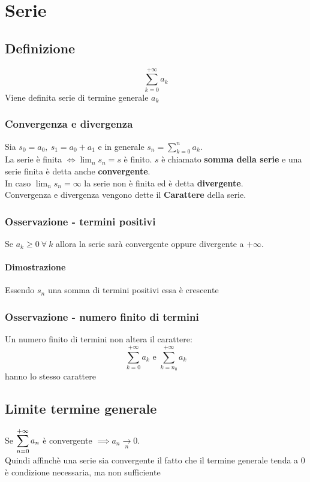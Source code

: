\chapter{Serie}
\section{Definizione}
$$\sum_{k = 0}^{+\infty}a_k$$
Viene definita serie di termine generale $a_k$
\subsection{Convergenza e divergenza}
Sia $s_0 = a_0,\ s_1 = a_0 + a_1$ e in generale $\displaystyle s_n = \sum_{k = 0}^n a_k$.\\
La serie  è finita $\iff \displaystyle \lim_n s_n = s$ è finito.
$s$ è chiamato \textbf{somma della serie} e una serie finita è detta anche \textbf{convergente}.\\
In caso $\displaystyle \lim_n s_n = \infty$ la serie non è finita ed è detta \textbf{divergente}.\\
Convergenza e divergenza vengono dette il \textbf{Carattere} della serie.
\subsection{Osservazione - termini positivi}
Se $a_k \geq 0\ \forall\ k$ allora la serie sarà convergente oppure divergente a $+\infty$.
\subsubsection{Dimostrazione}
Essendo $s_n$ una somma di termini positivi essa è crescente
\subsection{Osservazione - numero finito di termini}
Un numero finito di termini non altera il carattere:\\
$$\sum_{k = 0}^{+\infty}a_k \text{ e } \sum_{k = n_0}^{+\infty}a_k$$ hanno lo stesso carattere

\section{Limite termine generale}
Se $\displaystyle \sum_{n = 0}^{+\infty} a_n$ è convergente $\implies a_n \xrightarrow[n]{}0$.\\
Quindi affinchè una serie sia convergente il fatto che il termine generale tenda a 0 è condizione necessaria, ma non sufficiente

